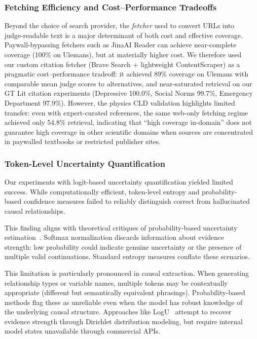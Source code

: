 \subsubsection{Fetching Efficiency and Cost--Performance Tradeoffs}

Beyond the choice of search provider, the \textit{fetcher} used to convert URLs into judge-readable text is a major determinant of both cost and effective coverage. Paywall-bypassing fetchers such as JinaAI Reader can achieve near-complete coverage (100\% on Ulemans), but at materially higher cost. We therefore used our custom citation fetcher (Brave Search + lightweight ContentScraper) as a pragmatic cost--performance tradeoff: it achieved 89\% coverage on Ulemans with comparable mean judge scores to alternatives, and near-saturated retrieval on our GT Lit citation experiments (Depressive 100.0\%, Social Norms 99.7\%, Emergency Department 97.9\%). However, the physics CLD validation highlights limited transfer: even with expert-curated references, the same web-only fetching regime achieved only 54.8\% retrieval, indicating that ``high coverage in-domain'' does not guarantee high coverage in other scientific domains when sources are concentrated in paywalled textbooks or restricted publisher sites.

\subsubsection{Token-Level Uncertainty Quantification}

Our experiments with logit-based uncertainty quantification yielded limited success. While computationally efficient, token-level entropy and probability-based confidence measures failed to reliably distinguish correct from hallucinated causal relationships.

This finding aligns with theoretical critiques of probability-based uncertainty estimation~\citep{ma2025estimatingllmuncertainty}. Softmax normalization discards information about evidence strength: low probability could indicate genuine uncertainty or the presence of multiple valid continuations. Standard entropy measures conflate these scenarios.

This limitation is particularly pronounced in causal extraction. When generating relationship types or variable names, multiple tokens may be contextually appropriate (different but semantically equivalent phrasings). Probability-based methods flag these as unreliable even when the model has robust knowledge of the underlying causal structure. Approaches like LogU~\citep{ma2025estimatingllmuncertainty} attempt to recover evidence strength through Dirichlet distribution modeling, but require internal model states unavailable through commercial APIs.

